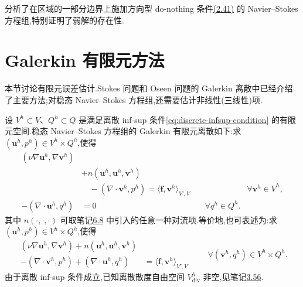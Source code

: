 \begin{note}\label{note:steady-ns-directional-do-nothing}
\textcite{BraackMucha2014} 分析了在区域的一部分边界上施加方向型 do-nothing 条件\hyperref[eq:directional-do-nothing]{(2.41)} 的 Navier--Stokes 方程组,特别证明了弱解的存在性.
\end{note}

\section{Galerkin 有限元方法}\label{sec:steady-ns-galerkin}

\begin{note}[内容]\label{note:steady-ns-galerkin-contents}
本节讨论有限元误差估计.Stokes 问题和 Oseen 问题的 Galerkin 离散中已经介绍了主要方法;对稳态 Navier--Stokes 方程组,还需要估计非线性(三线性)项.
\end{note}

\begin{note}\label{note:steady-ns-galerkin-formulation}
设 $V^h\subset V$、$Q^h\subset Q$ 是满足离散 inf-sup 条件\cref{eq:discrete-infsup-condition} 的有限元空间.稳态 Navier--Stokes 方程组的 Galerkin 有限元离散如下:求 $(\bm{u}^h,p^h)\in V^h\times Q^h$,使得
\begin{equation}\label{eq:steady-ns-galerkin}
\begin{aligned}
  (\nu\nabla\bm{u}^h,\nabla\bm{v}^h)\\
  &+n(\bm{u}^h,\bm{u}^h,\bm{v}^h)\\
  &\quad-(\nabla\cdot\bm{v}^h,p^h)
    =\langle\bm{f},\bm{v}^h\rangle_{V',V}
      &&\forall\bm{v}^h\in V^h,\\
  -(\nabla\cdot\bm{u}^h,q^h)&=0
      &\quad\forall q^h\in Q^h.
\end{aligned}
\end{equation}
其中 $n(\cdot,\cdot,\cdot)$ 可取笔记\hyperref[note:steady-ns-equivalent-variational-forms]{6.8} 中引入的任意一种对流项.等价地,也可表述为:求 $(\bm{u}^h,p^h)\in V^h\times Q^h$,使得
\begin{equation}\label{eq:steady-ns-galerkin-combined}
\begin{aligned}
  (\nu\nabla\bm{u}^h,\nabla\bm{v}^h)
  +n(\bm{u}^h,\bm{u}^h,\bm{v}^h)\\
  -(\nabla\cdot\bm{v}^h,p^h)
  +(\nabla\cdot\bm{u}^h,q^h)
    &=\langle\bm{f},\bm{v}^h\rangle_{V',V}
\end{aligned}
\qquad\forall(\bm{v}^h,q^h)\in V^h\times Q^h.
\end{equation}
由于离散 inf-sup 条件成立,已知离散散度自由空间 $V_{\mathrm{div}}^h$ 非空,见笔记\hyperref[note:discretely-divergence-free-space]{3.56}.
\end{note}

